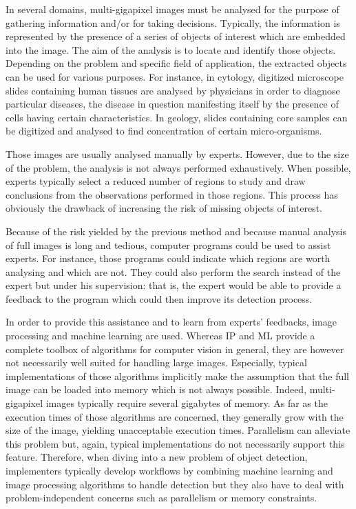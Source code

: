 In several domains, multi-gigapixel images must be analysed for the purpose of gathering information and/or for taking decisions. Typically, the information is represented by the presence of a series of objects of interest which are embedded into the image. The aim of the analysis is to locate and identify those objects. Depending on the problem and  specific field of application, the extracted objects can be used for various purposes. For instance, in cytology, digitized microscope slides containing human tissues are analysed by physicians in order to diagnose particular diseases, the disease in question manifesting itself by the presence of cells having certain characteristics. In geology, slides containing core samples can be digitized and analysed to find concentration of certain micro-organisms.

Those images are usually analysed manually by experts. However, due to the size of the problem, the analysis is not always performed exhaustively. When possible, experts typically select a reduced number of regions to study and draw conclusions from the observations performed in those regions. This process has obviously the drawback of increasing the risk of missing objects of interest.

Because of the risk yielded by the previous method and because manual analysis of full images is long and tedious, computer programs could be used to assist experts. For instance, those programs could indicate which regions are worth analysing and which are not. They could also perform the search instead of the expert but under his supervision: that is, the expert would be able to provide a feedback to the program which could then improve its detection process. 

In order to provide this assistance and to learn from experts' feedbacks, image processing and machine learning are used. Whereas IP and ML provide a complete toolbox of algorithms for computer vision in general, they are however not necessarily well suited for handling large images. Especially, typical implementations of those algorithms implicitly make the assumption that the full image can be loaded into memory which is not always possible. Indeed, multi-gigapixel images typically require several gigabytes of memory. As far as the execution times of those algorithms are concerned, they generally grow with the size of the image, yielding unacceptable execution times. Parallelism can alleviate this problem but, again, typical implementations do not necessarily support this feature. Therefore, when diving into a new problem of object detection, implementers typically develop workflows by combining machine learning and image processing algorithms to handle detection but they also have to deal with problem-independent concerns such as parallelism or memory constraints. 

